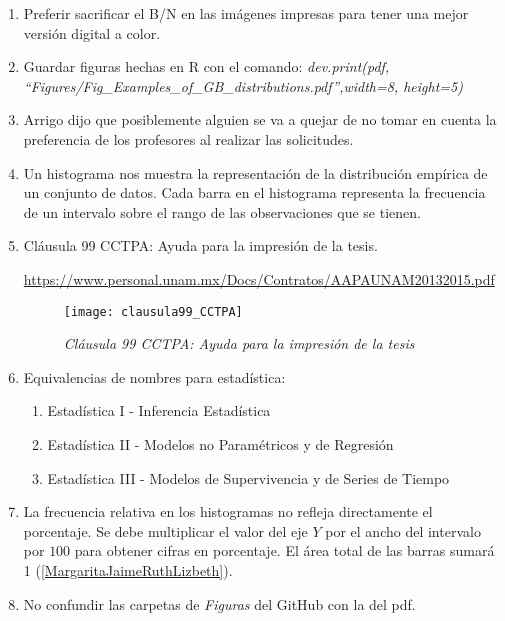 \begin{appendices}
\begin{enumerate}
  \item Preferir sacrificar el B/N en las imágenes impresas para tener una mejor versión digital a color.
  
  \item Guardar figuras hechas en R con el comando: \textit{dev.print(pdf, ``Figures/Fig\_Examples\_of\_GB\_distributions.pdf'',width=8, height=5)}
  
  \item Arrigo dijo que posiblemente alguien se va a quejar de no tomar en cuenta la preferencia de los profesores al realizar las solicitudes.
  
  \item Un histograma nos muestra la representación de la distribución empírica de un conjunto de datos. Cada barra en el histograma representa la frecuencia de un intervalo sobre el rango de las observaciones que se tienen.
  
  \item Cláusula 99 CCTPA: Ayuda para la impresión de la tesis.
  
  \url{https://www.personal.unam.mx/Docs/Contratos/AAPAUNAM20132015.pdf}

\begin{figure}[H]
\centering
\texttt{[image: clausula99\_CCTPA]} %
\caption{\textit{Cláusula 99 CCTPA: Ayuda para la impresión de la tesis}}
\end{figure}
  
  \item Equivalencias de nombres para estadística:
  \begin{enumerate}
  \item Estadística I - Inferencia Estadística
  
  \item Estadística II - Modelos no Paramétricos y de Regresión
  
  \item Estadística III - Modelos de Supervivencia y de Series de Tiempo
  \end{enumerate}
  
  \item La frecuencia relativa en los histogramas no refleja directamente el porcentaje. Se debe multiplicar el valor del eje $Y$ por el ancho del intervalo por $100$ para obtener cifras en porcentaje. El área total de las barras sumará 1 (\ref{MargaritaJaimeRuthLizbeth}).
  
  \item No confundir las carpetas de \textit{Figuras} del GitHub con la del pdf.
  

\end{enumerate}
\end{appendices}
